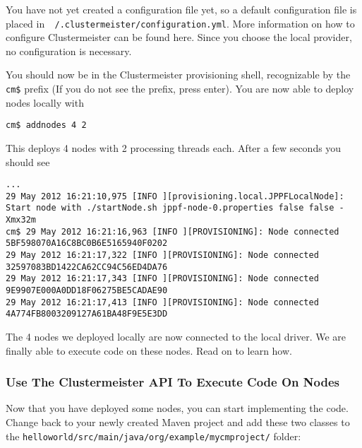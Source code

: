 \documentclass{article}
\begin{document}
You have not yet created a configuration file yet, so a default configuration file is placed in\texttt{ ~/.clustermeister/configuration.yml}. More information on how to configure Clustermeister can be found here. Since you choose the local provider, no configuration is necessary.

You should now be in the Clustermeister provisioning shell, recognizable by the \texttt{cm\$} prefix (If you do not see the prefix, press enter). You are now able to deploy nodes locally with

\begin{lstlisting}[breaklines=true, backgroundcolor=\color{lbcolor}]
cm$ addnodes 4 2
\end{lstlisting}

This deploys 4 nodes with 2 processing threads each. After a few seconds you should see

\begin{lstlisting}[breaklines=true, backgroundcolor=\color{lbcolor}]
...
29 May 2012 16:21:10,975 [INFO ][provisioning.local.JPPFLocalNode]: Start node with ./startNode.sh jppf-node-0.properties false false -Xmx32m
cm$ 29 May 2012 16:21:16,963 [INFO ][PROVISIONING]: Node connected 5BF598070A16C8BC0B6E5165940F0202
29 May 2012 16:21:17,322 [INFO ][PROVISIONING]: Node connected 32597083BD1422CA62CC94C56ED4DA76
29 May 2012 16:21:17,343 [INFO ][PROVISIONING]: Node connected 9E9907E000A0DD18F06275BE5CADAE90
29 May 2012 16:21:17,413 [INFO ][PROVISIONING]: Node connected 4A774FB8003209127A61BA48F9E5E3DD
\end{lstlisting}

The 4 nodes we deployed locally are now connected to the local driver. We are finally able to execute code on these nodes. Read on to learn how.

\subsubsection{Use The Clustermeister API To Execute Code On Nodes}

Now that you have deployed some nodes, you can start implementing the code. Change back to your newly created Maven project and add these two classes to the \texttt{helloworld/src/main/java/org/example/mycmproject/} folder:




\end{document}
